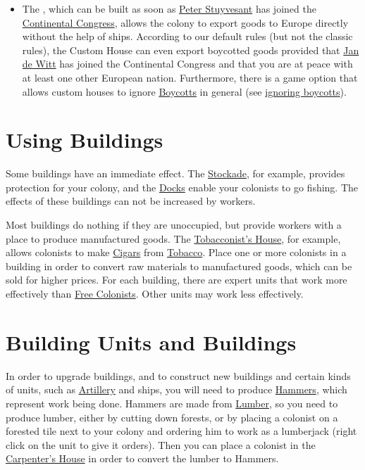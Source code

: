 \documentclass[12pt]{book}
\begin{document}
\begin{itemize}
\item The , which can be built as soon as
  \hyperlink{Peter Stuyvesant}{Peter Stuyvesant} has joined the
  \hyperlink{Continental Congress}{Continental Congress}, allows the
  colony to export goods to Europe directly without the help of
  ships. According to our default rules (but not the classic rules),
  the Custom House can even export boycotted goods provided that
  \hyperlink{Jan de Witt}{Jan de Witt} has joined the Continental
  Congress and that you are at peace with at least one other European
  nation. Furthermore, there is a game option that allows custom
  houses to ignore \hyperlink{Boycotts}{Boycotts} in general (see
  \hyperlink{ignore boycotts}{ignoring boycotts}).

\end{itemize}


\hypertarget{Using Buildings}{\section{Using Buildings}}

Some buildings have an immediate effect. The
\hyperlink{Stockade}{Stockade}, for example, provides protection for
your colony, and the \hyperlink{Dock}{Docks} enable your colonists to
go fishing. The effects of these buildings can not be increased by
workers.

Most buildings do nothing if they are unoccupied, but provide workers
with a place to produce manufactured goods. The
\hyperlink{Tobacconist's House}{Tobacconist's House}, for example,
allows colonists to make \hyperlink{Cigars}{Cigars} from
\hyperlink{Tobacco}{Tobacco}. Place one or more colonists in a
building in order to convert raw materials to manufactured goods,
which can be sold for higher prices. For each building, there are
expert units that work more effectively than \hyperlink{Free
  Colonist}{Free Colonists}. Other units may work less effectively.


\hypertarget{Building Units and Buildings}{\section{Building Units
and Buildings}}

In order to upgrade buildings, and to construct new buildings and
certain kinds of units, such as \hyperlink{Artillery}{Artillery} and
ships, you will need to produce \hyperlink{Hammers}{Hammers}, which
represent work being done. Hammers are made from
\hyperlink{Lumber}{Lumber}, so you need to produce lumber, either by
cutting down forests, or by placing a colonist on a forested tile next
to your colony and ordering him to work as a lumberjack (right click
on the unit to give it orders). Then you can place a colonist in the
\hyperlink{Carpenter's House}{Carpenter's House} in order to convert
the lumber to Hammers.
\end{document}

